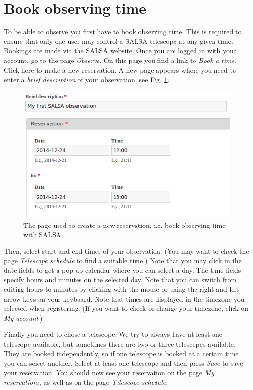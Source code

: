 \section{Book observing time}
To be able to observe you first have to book observing time. This is required
to ensure that only one user may control a SALSA telescope at any given time.
Bookings are made via the SALSA website. Once you are logged in with your
account, go to the page \emph{Observe}. On this page you find a link to
\emph{Book a time}. Click here to make a new reservation.  A new
page appears where you need to enter a \emph{brief description} of your
observation, see Fig. \ref{fig:book}.
\begin{figure}[h]
\centering
\includegraphics[width=\textwidth]{../figures/SALSA_book.png}
\caption{\label{fig:book} The page used to create a new reservation, i.e.
	book observing time with SALSA.}
\end{figure}

Then, select start and end times of your observation. (You may want to check
the page \emph{Telescope schedule} to find a suitable time.)  Note that you may
click in the date-fields to get a pop-up calendar where you can select a day.
The time fields specify hours and minutes on the selected day. Note that you
can switch from editing hours to minutes by clicking with the mouse or using
the right and left arrow-keys on your keyboard. Note that times are displayed
in the timezone you selected when registering. (If you want to check or change
your timezone, click on \emph{My account}.)

Finally you need to chose a telescope. We try to always have at least one
telescope available, but sometimes there are two or three telescopes available.
They are booked independently, so if one telescope is booked at a certain time
you can select another.  Select at least one telescope and then press
\emph{Save} to save your reservation.  You should now see your reservation on
the page \emph{My reservations}, as well as on the page \emph{Telescope
schedule}. 

